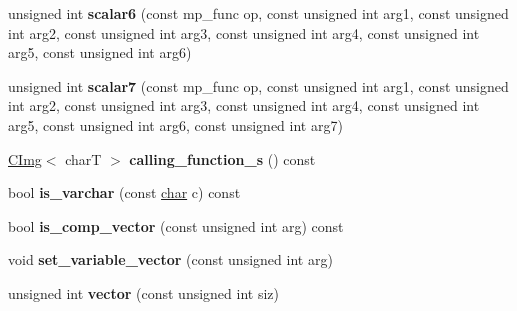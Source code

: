 \begin{DoxyCompactItemize}
unsigned int {\bfseries scalar6} (const mp\+\_\+func op, const unsigned int arg1, const unsigned int arg2, const unsigned int arg3, const unsigned int arg4, const unsigned int arg5, const unsigned int arg6)
\item 
\mbox{\label{structcimg__library__suffixed_1_1CImg_1_1__cimg__math__parser_ae095d22c230ed8cb9760fad0a797569a}} 
unsigned int {\bfseries scalar7} (const mp\+\_\+func op, const unsigned int arg1, const unsigned int arg2, const unsigned int arg3, const unsigned int arg4, const unsigned int arg5, const unsigned int arg6, const unsigned int arg7)
\item 
\mbox{\label{structcimg__library__suffixed_1_1CImg_1_1__cimg__math__parser_a3c1ad35e2c4176169400bb544dd9672f}} 
\hyperlink{structcimg__library__suffixed_1_1CImg}{C\+Img}$<$ charT $>$ {\bfseries calling\+\_\+function\+\_\+s} () const
\item 
\mbox{\label{structcimg__library__suffixed_1_1CImg_1_1__cimg__math__parser_a2631b8f9f5ac6aa3b4e643516cbf8251}} 
bool {\bfseries is\+\_\+varchar} (const \hyperlink{classchar}{char} c) const
\item 
\mbox{\label{structcimg__library__suffixed_1_1CImg_1_1__cimg__math__parser_a6561d943a1b6cb866ac72467a837a4c9}} 
bool {\bfseries is\+\_\+comp\+\_\+vector} (const unsigned int arg) const
\item 
\mbox{\label{structcimg__library__suffixed_1_1CImg_1_1__cimg__math__parser_a093e737711b2d78bbfdad351794b5b33}} 
void {\bfseries set\+\_\+variable\+\_\+vector} (const unsigned int arg)
\item 
\mbox{\label{structcimg__library__suffixed_1_1CImg_1_1__cimg__math__parser_ab3f43a472fa110840243eb500a5b4b2e}} 
unsigned int {\bfseries vector} (const unsigned int siz)
\item 
\mbox{\label{structcimg__library__suffixed_1_1CImg_1_1__cimg__math__parser_a3a440fb39b9743c44337f4f930f12def}} 

\end{DoxyCompactItemize}
